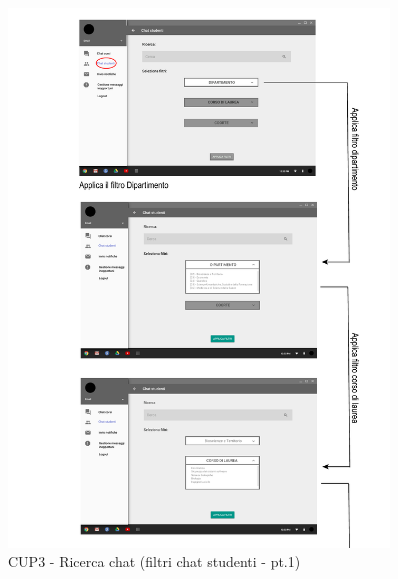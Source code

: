 \begin{figure}
	\centering
	\includegraphics[width=0.9\textwidth]{imgs/gruppo6/activities/act_cup3_filtro_chat_studenti1.pdf}
	\caption{CUP3 - Ricerca chat (filtri chat studenti - pt.1)}
	\label{fig:cup3-3}
\end{figure}

